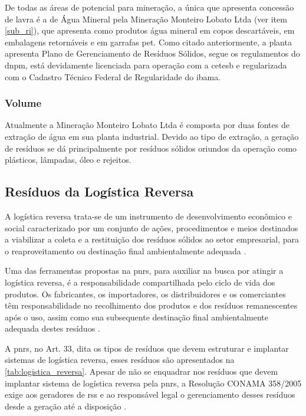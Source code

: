 De todas as áreas de potencial para mineração, a única que apresenta concessão de lavra é a de Água Mineral pela Mineração Monteiro Lobato Ltda (ver item \ref{sub_ri}), que apresenta como produtos água mineral em copos descartáveis, em embalagens retornáveis e em garrafas \gls{pet}. Como citado anteriormente, a planta apresenta Plano de Gerenciamento de Resíduos Sólidos, segue os regulamentos do \gls{dnpm}, está devidamente licenciada para operação com a \gls{cetesb} e regularizada com o Cadastro Técnico Federal de Regularidade do \gls{ibama}.

\subsubsection{Volume}
Atualmente a Mineração Monteiro Lobato Ltda é composta por duas fontes de extração de água em sua planta industrial. Devido ao tipo de extração, a geração de resíduos se dá principalmente por resíduos sólidos oriundos da operação como plásticos, lâmpadas, óleo e rejeitos.


\subsection{Resíduos da Logística Reversa}
A logística reversa trata-se de um instrumento de desenvolvimento econômico e social caracterizado por um conjunto de ações, procedimentos e meios destinados a viabilizar a coleta e a restituição dos resíduos sólidos ao setor empresarial, para o reaproveitamento ou destinação final ambientalmente adequada \cite{brasil:12305}. 

Uma das ferramentas propostas na \gls{pnrs}, para auxiliar na busca por atingir a logística reversa, é a responsabilidade compartilhada pelo ciclo de vida dos produtos. Os fabricantes, os importadores, os distribuidores e os comerciantes têm responsabilidade no recolhimento dos produtos e dos resíduos remanescentes após o uso, assim como sua subsequente destinação final ambientalmente adequada destes resíduos \cite{brasil:12305}.

A \gls{pnrs}, no Art. 33, dita os tipos de resíduos que devem estruturar e implantar sistemas de logística reversa, esses resíduos são apresentados na \autoref{tab:logistica_reversa}. Apesar de não se enquadrar nos resíduos que devem implantar sistema de logística reversa pela \gls{pnrs}, a Resolução CONAMA 358/2005 exige aos geradores de \gls{rss} e ao responsável legal o gerenciamento desses resíduos desde a geração até a disposição \cite{conama:358}.

